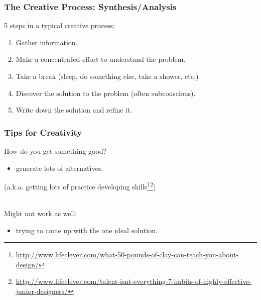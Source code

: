 \begin{frame}
\frametitle{The Creative Process: Synthesis/Analysis}

\begin{changemargin}{.5cm}
5 steps in a typical creative process:
\begin{enumerate}
\item Gather information.
\item Make a concentrated effort to understand the problem.
\item Take a break (sleep, do something else, take a shower, etc.)
\item Discover the solution to the problem (often subconscious).
\item Write down the solution and refine it.
\end{enumerate}
\end{changemargin}

\end{frame}

\begin{frame}
\frametitle{Tips for Creativity}

\begin{changemargin}{1cm}
How do you get something good?

\begin{itemize}
\item generate lots of alternatives.
\end{itemize}

(a.k.a. getting lots of practice developing 
skills\footnote{\tiny \url{http://www.lifeclever.com/what-50-pounds-of-clay-can-teach-you-about-design/}}\footnote{\tiny \url{http://www.lifeclever.com/talent-isnt-everything-7-habits-of-highly-effective-junior-designers/}})

~\\[1em]
Might not work as well:

\begin{itemize}
\item trying to come up with the one ideal solution.
\end{itemize}
\end{changemargin}

\end{frame}

